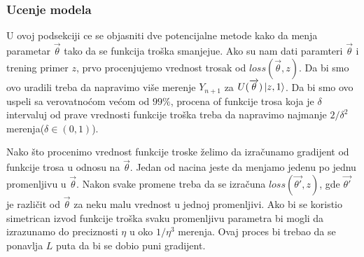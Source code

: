 \documentclass[12pt, letterpaper, oneside]{article}
\begin{document}
\subsubsection{Ucenje modela}
U ovoj podsekciji ce se objasniti dve potencijalne metode kako da menja parametar $\overrightarrow{\theta}$ tako da se funkcija troška smanjejue.
Ako su nam dati paramteri $\overrightarrow{\theta}$ i trening primer $z$, prvo procenjujemo vrednost trosak od $\mathit{loss}(\overrightarrow{\theta},z)$.
Da bi smo ovo uradili treba da napravimo više merenje $Y_{n+1}$ za $U(\overrightarrow{\theta})\Ket{z,1}$.
Da bi smo ovo uspeli sa verovatnoćom većom od $99\%$, procena of funkcije trosa koja je $\delta$ intervaluj od prave vrednosti funkcije troška
treba da napravimo najmanje $2/\delta^2$ merenja($\delta \in (0,1)$).

Nako što procenimo vrednost funkcije troske želimo da izračunamo gradijent od funkcije trosa u odnosu na $\overrightarrow{\theta}$.
Jedan od nacina jeste da menjamo jedenu po jednu promenljivu u $\overrightarrow{\theta}$. Nakon svake promene treba da se izračuna
$\mathit{loss}(\overrightarrow{\theta'},z)$, gde $\overrightarrow{\theta'}$ je različit od $\overrightarrow{\theta}$ za neku malu vrednost u jednoj promenljivi.
Ako bi se koristio simetrican izvod funkcije troška svaku promenljivu parametra bi mogli da izrazunamo do preciznosti $\eta$ u oko $1/\eta^3$ merenja.
Ovaj proces bi trebao da se ponavlja $L$ puta da bi se dobio puni gradijent.
\end{document}
